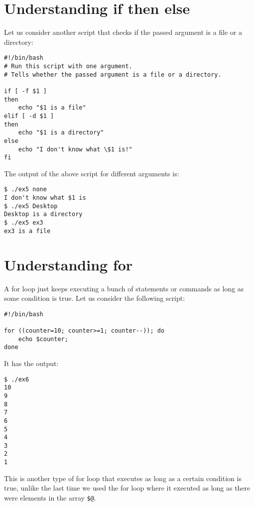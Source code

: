 	\section{Understanding if then else}
Let us consider another script that checks if the passed argument is a file or a directory:

\vspace{-15pt}
\begin{verbatim}
#!/bin/bash
# Run this script with one argument.
# Tells whether the passed argument is a file or a directory.

if [ -f $1 ]
then
	echo "$1 is a file"
elif [ -d $1 ]
then
	echo "$1 is a directory"
else
	echo "I don't know what \$1 is!"
fi
\end{verbatim}
\vspace{-10pt}	

\noindent
The output of the above script for different arguments is:

\vspace{-15pt}
\begin{verbatim}
$ ./ex5 none
I don't know what $1 is
$ ./ex5 Desktop
Desktop is a directory
$ ./ex5 ex3
ex3 is a file
\end{verbatim}
\vspace{-10pt}	

\section{Understanding for}
A for loop just keeps executing a bunch of statements or commands as long as some condition is true. Let us consider the following script:

\vspace{-15pt}
\begin{verbatim}
#!/bin/bash

for ((counter=10; counter>=1; counter--)); do
	echo $counter;
done	
\end{verbatim}
\vspace{-10pt}	

\noindent
It has the output:

\vspace{-15pt}
\begin{verbatim}
$ ./ex6
10
9
8
7
6
5
4
3
2
1
\end{verbatim}
\vspace{-10pt}	

\noindent
This is another type of for loop that executes as long as a certain condition is true, unlike the last time we used the for loop where it executed as long as there were elements in the array \verb|$@|. 

